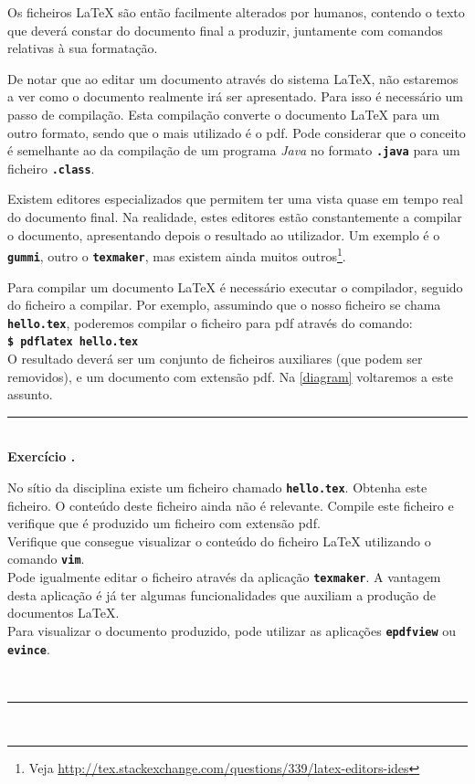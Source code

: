 \documentclass[11pt,a4paper,article]{memoir}
\newcommand{\foreign}[2][nohyphenation]{\protect\foreignlanguage{#1}{\slshape{#2}}}
\newcommand{\english}[1]{\foreign[english]{#1}}
\newcommand{\code}[1]{\texttt{\textbf{#1}}}
\newcounter{Exctr}
\newenvironment{exercicio}%
{%
\refstepcounter{Exctr}%
\noindent\begin{minipage}{\textwidth}
\vspace*{5pt}
\noindent%
\makebox[0pt]{\rule[-4pt]{1pt}{5pt}}%
\rule{1.05\textwidth}{1pt}%
\makebox[0pt]{\rule[-4pt]{1pt}{5pt}}%
\\
\hspace*{6pt}\textbf{\large Exercício \arabic{chapter}.\arabic{Exctr}}\vspace*{10pt}\\
\hspace*{0.025\textwidth}\begin{minipage}[t]{0.95\textwidth}
}%
{%
\end{minipage}
\hfill\\
\noindent\makebox[0pt]{\rule{1pt}{5pt}}%
\rule{1.05\textwidth}{1pt}%
\makebox[0pt]{\rule{1pt}{5pt}}
\vspace*{5pt}
\end{minipage}\\
}
\begin{document}
Os ficheiros {\LaTeX} são então facilmente alterados por humanos, contendo o
texto que deverá constar do documento final a produzir, juntamente com comandos
relativas à sua formatação.

De notar que ao editar um documento através do sistema {\LaTeX}, não estaremos a ver
como o documento realmente irá ser apresentado. Para isso é necessário um passo de
compilação. Esta compilação converte o documento {\LaTeX} para um outro formato,
sendo que o mais utilizado é o \ac{pdf}. Pode considerar que o conceito é semelhante
ao da compilação de um programa \english{Java} no formato \code{.java} 
para um ficheiro \code{.class}.

Existem editores especializados que permitem ter uma vista quase em tempo real do
documento final. Na realidade, estes editores estão constantemente a compilar 
o documento, apresentando depois o resultado ao utilizador. 
Um exemplo é o \code{gummi}, outro o \code{texmaker}, mas existem ainda muitos 
outros\footnote{Veja \url{http://tex.stackexchange.com/questions/339/latex-editors-ides}}.

Para compilar um documento {\LaTeX} é necessário executar o compilador, seguido do
ficheiro a compilar. Por exemplo, assumindo que o nosso ficheiro se chama 
\code{hello.tex}, poderemos compilar o ficheiro para \ac{pdf} através 
do comando:\\

\code{\$ pdflatex hello.tex}\\

\noindent
O resultado deverá ser um conjunto de ficheiros auxiliares (que podem ser removidos), e
um documento com extensão \ac{pdf}. Na \autoref{diagram} voltaremos a este assunto.

\begin{exercicio}
No sítio da disciplina existe um ficheiro chamado \code{hello.tex}. Obtenha este 
ficheiro. O conteúdo deste ficheiro ainda não é relevante. Compile este ficheiro
 e verifique que é produzido um ficheiro com extensão \acs{pdf}.\\

Verifique que consegue visualizar o conteúdo do ficheiro {\LaTeX} utilizando o comando
\code{vim}.\\

Pode igualmente editar o ficheiro através da aplicação \code{texmaker}. A vantagem
desta aplicação é já ter algumas funcionalidades que auxiliam a produção de
documentos {\LaTeX}.\\

Para visualizar o documento produzido, pode utilizar as aplicações \code{epdfview} 
ou \code{evince}.
\end{exercicio}
\end{document}
